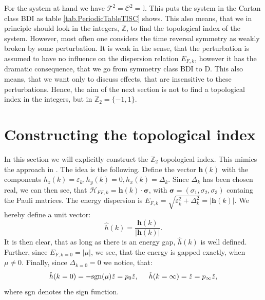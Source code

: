 For the system at hand we have $\mathcal{T}^2 = \mathcal{C}^2 = \mathbb{I}$. This puts the system in the Cartan class BDI as table \ref{tab.PeriodicTableTISC} shows. This also means, that we in principle should look in the integers, $\mathbb{Z}$, to find the topological index of the system. However, most often one considers the time reversal symmetry as weakly broken by some perturbation. It is weak in the sense, that the perturbation is assumed to have no influence on the dispersion relation $E_{F,k}$, however it has the dramatic consequence, that we go from symmetry class BDI to D. This also means, that we want only to discuss effects, that are insensitive to these perturbations. Hence, the aim of the next section is not to find a topological index in the integers, but in $\mathbb{Z}_2=\{-1,1\}$. 

\section{Constructing the topological index}
In this section we will explicitly construct the $\mathbb{Z}_2$ topological index. This mimics the approach in \cite{Alicea}. The idea is the following. Define the vector $\mathbf{h}(k)$ with the components $h_z(k) = \varepsilon_k, h_y(k) = 0, h_x(k) = \Delta_k$. Since $\Delta_k$ has been chosen real, we can then see, that $\mathcal{H}_{FF,k} = \mathbf{h}(k)\cdot\boldsymbol\sigma$, with $\boldsymbol\sigma = (\sigma_1,\sigma_2,\sigma_3)$ containg the Pauli matrices. The energy dispersion is $E_{F,k} = \sqrt{\varepsilon^2_k + \Delta^2_k} = |\mathbf{h}(k)|$. We hereby define a unit vector:
\begin{equation}
\hat{h}(k) = \frac{\mathbf{h}(k)}{|\mathbf{h}(k)|}. 
\label{eq.hhatdefinition}
\end{equation}
It is then clear, that as long as there is an energy gap, $\hat{h}(k)$ is well defined. Further, since $E_{F,k=0} = |\mu|$, we see, that the energy is gapped exactly, when $\mu \neq 0$. Finally, since $\Delta_{k=0} = 0$ we notice, that: 
\begin{equation}
\hat{h}(k=0) = -\text{sgn}(\mu)\hat{z} = p_0\hat{z}, \hspace{0.5cm} \hat{h}(k=\infty) = \hat{z} = p_{\infty}\hat{z},
\label{eq.hhatk0kinfty}
\end{equation}
where $\text{sgn}$ denotes the sign function. 

